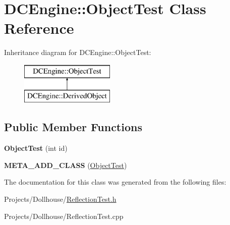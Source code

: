 \hypertarget{classDCEngine_1_1ObjectTest}{\section{D\-C\-Engine\-:\-:Object\-Test Class Reference}
\label{classDCEngine_1_1ObjectTest}
}
Inheritance diagram for D\-C\-Engine\-:\-:Object\-Test\-:\begin{figure}[H]
\begin{center}
\leavevmode
\includegraphics[height=2.000000cm]{classDCEngine_1_1ObjectTest}
\end{center}
\end{figure}
\subsection*{Public Member Functions}
\begin{DoxyCompactItemize}
\item 
\hypertarget{classDCEngine_1_1ObjectTest_a04391a06d2f5ced7a4a4cf7bf1f41fa7}{{\bfseries Object\-Test} (int id)}\label{classDCEngine_1_1ObjectTest_a04391a06d2f5ced7a4a4cf7bf1f41fa7}

\item 
\hypertarget{classDCEngine_1_1ObjectTest_a0f3aacec7787db322df189983d391efa}{{\bfseries M\-E\-T\-A\-\_\-\-A\-D\-D\-\_\-\-C\-L\-A\-S\-S} (\hyperlink{classDCEngine_1_1ObjectTest}{Object\-Test})}\label{classDCEngine_1_1ObjectTest_a0f3aacec7787db322df189983d391efa}

\end{DoxyCompactItemize}


The documentation for this class was generated from the following files\-:\begin{DoxyCompactItemize}
\item 
Projects/\-Dollhouse/\hyperlink{ReflectionTest_8h}{Reflection\-Test.\-h}\item 
Projects/\-Dollhouse/Reflection\-Test.\-cpp\end{DoxyCompactItemize}

